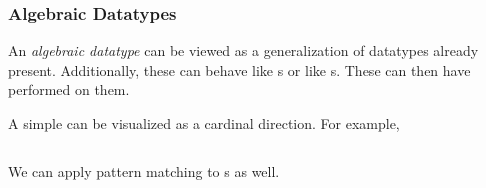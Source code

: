 \subsubsection{Algebraic Datatypes}\label{subsubsec:Functional-SML-Algebraic_Datatypes}
\begin{definition}\label{def:Algebraic_Datatype}
  An \emph{algebraic datatype} can be viewed as a generalization of datatypes already present.
  Additionally, these can behave like s or like s.
  These can then have  performed on them.
\end{definition}

A simple  can be visualized as a cardinal direction.
For example,
\inputminted[frame=lines,linenos]{sml}{./EDAP05-Concepts_Programming_Languages-Sections/Code/Algebraic_Datatype-Direction.sml}

We can apply pattern matching to s as well.
\inputminted[frame=lines,linenos]{sml}{./EDAP05-Concepts_Programming_Languages-Sections/Code/Algebraic_Datatype-Direction-Pattern_Match.sml}

